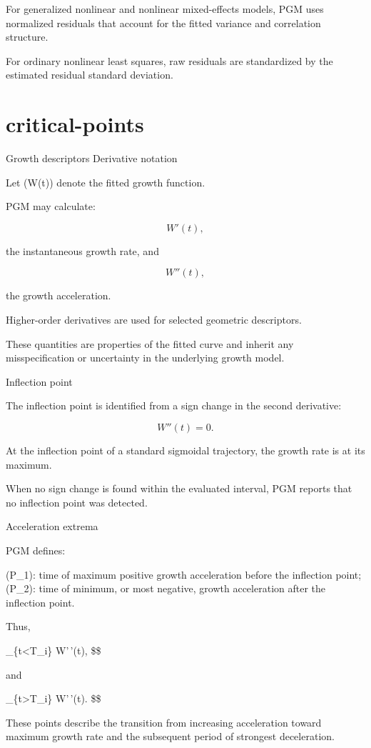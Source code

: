 \documentclass[
  english,
  letterpaper,
  DIV=11,
  numbers=noendperiod]{scrreprt}
\begin{document}
For generalized nonlinear and nonlinear mixed-effects models, PGM uses
normalized residuals that account for the fitted variance and
correlation structure.

For ordinary nonlinear least squares, raw residuals are standardized by
the estimated residual standard deviation.

\chapter{critical-points}\label{critical-points}

Growth descriptors Derivative notation

Let (W(t)) denote the fitted growth function.

PGM may calculate:

\[
W'(t),
\]

the instantaneous growth rate, and

\[
W''(t),
\]

the growth acceleration.

Higher-order derivatives are used for selected geometric descriptors.

These quantities are properties of the fitted curve and inherit any
misspecification or uncertainty in the underlying growth model.

Inflection point

The inflection point is identified from a sign change in the second
derivative:

\[
W''(t)=0.
\]

At the inflection point of a standard sigmoidal trajectory, the growth
rate is at its maximum.

When no sign change is found within the evaluated interval, PGM reports
that no inflection point was detected.

Acceleration extrema

PGM defines:

(P\_1): time of maximum positive growth acceleration before the
inflection point; (P\_2): time of minimum, or most negative, growth
acceleration after the inflection point.

Thus,

\arg\max\_\{t\textless T\_i\} W'\,'(t), \$\$

and

\arg\min\_\{t\textgreater T\_i\} W'\,'(t). \$\$

These points describe the transition from increasing acceleration toward
maximum growth rate and the subsequent period of strongest deceleration.
\end{document}
